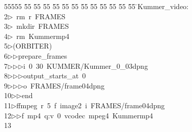 %
%
\begin{tabbing}
55555 \= 55 \= 55 \= 55 \= 55 \= 55 \= 55 \= 55 \= 55 \= 55 \= 55 \= 55 \= 55 \= \>Kummer\_video:\\[0pt]
2\>$\triangleright$\>\ rm\ r\ FRAMES\\[0pt]
3\>$\triangleright$\>\ mkdir\ FRAMES\\[0pt]
4\>$\triangleright$\>\ rm\ Kummermp4\\[0pt]
5\>$\triangleright$\>(ORBITER)\ \\[0pt]
6\>$\triangleright$\>$\triangleright$\>prepare\_frames\ \\[0pt]
7\>$\triangleright$\>$\triangleright$\>$\triangleright$\>i\ 0\ 30\ KUMMER/Kummer\_0\_03dpng\ \\[0pt]
8\>$\triangleright$\>$\triangleright$\>$\triangleright$\>output\_starts\_at\ 0\ \\[0pt]
9\>$\triangleright$\>$\triangleright$\>$\triangleright$\>o\ FRAMES/frame04dpng\ \\[0pt]
10\>$\triangleright$\>$\triangleright$\>end\\[0pt]
11\>$\triangleright$\>ffmpeg\ r\ 5\ f\ image2\ i\ FRAMES/frame04dpng\ \\[0pt]
12\>$\triangleright$\>$\triangleright$\>f\ mp4\ q:v\ 0\ vcodec\ mpeg4\ Kummermp4\\[0pt]
13\>\end{tabbing}
